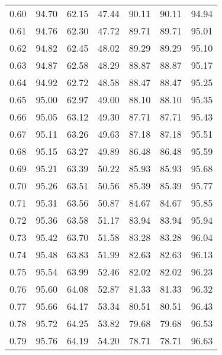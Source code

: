 \begin{tabular}{|c|c|c|c|c|c|c|}
      0.60 &     94.70 &     62.15 &      47.44 &   90.11 &      90.11 &         94.94 \\
      0.61 &     94.76 &     62.30 &      47.72 &   89.71 &      89.71 &         95.01 \\
      0.62 &     94.82 &     62.45 &      48.02 &   89.29 &      89.29 &         95.10 \\
      0.63 &     94.87 &     62.58 &      48.29 &   88.87 &      88.87 &         95.17 \\
      0.64 &     94.92 &     62.72 &      48.58 &   88.47 &      88.47 &         95.25 \\
      0.65 &     95.00 &     62.97 &      49.00 &   88.10 &      88.10 &         95.35 \\
      0.66 &     95.05 &     63.12 &      49.30 &   87.71 &      87.71 &         95.43 \\
      0.67 &     95.11 &     63.26 &      49.63 &   87.18 &      87.18 &         95.51 \\
      0.68 &     95.15 &     63.27 &      49.89 &   86.48 &      86.48 &         95.59 \\
      0.69 &     95.21 &     63.39 &      50.22 &   85.93 &      85.93 &         95.68 \\
      0.70 &     95.26 &     63.51 &      50.56 &   85.39 &      85.39 &         95.77 \\
      0.71 &     95.31 &     63.56 &      50.87 &   84.67 &      84.67 &         95.85 \\
      0.72 &     95.36 &     63.58 &      51.17 &   83.94 &      83.94 &         95.94 \\
      0.73 &     95.42 &     63.70 &      51.58 &   83.28 &      83.28 &         96.04 \\
      0.74 &     95.48 &     63.83 &      51.99 &   82.63 &      82.63 &         96.13 \\
      0.75 &     95.54 &     63.99 &      52.46 &   82.02 &      82.02 &         96.23 \\
      0.76 &     95.60 &     64.08 &      52.87 &   81.33 &      81.33 &         96.32 \\
      0.77 &     95.66 &     64.17 &      53.34 &   80.51 &      80.51 &         96.43 \\
      0.78 &     95.72 &     64.25 &      53.82 &   79.68 &      79.68 &         96.53 \\
      0.79 &     95.76 &     64.19 &      54.20 &   78.71 &      78.71 &         96.63 \\

\end{tabular}
